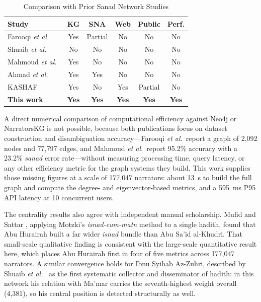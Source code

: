 \documentclass[conference]{IEEEtran}
\begin{document}
\begin{table}[!t]
\caption{Comparison with Prior Sanad Network Studies}
\label{tab:compare}
\centering
\renewcommand{\arraystretch}{1.3}
\begin{tabular}{p{1.95cm}ccccc}
\toprule
Study & KG & SNA & Web & Public & Perf. \\
\midrule
Farooqi \textit{et al.}~\cite{FAROOQI2024110439}   & Yes & Partial & No  & No  & No \\
Shuaib \textit{et al.}~\cite{Shuaib2022}           & No  & No      & No  & No  & No \\
Mahmoud \textit{et al.}~\cite{Mahmoud2024}         & Yes & No      & No  & No  & No \\
Ahmad \textit{et al.}~\cite{ahmad2025hadith}       & Yes & Yes     & No  & No  & No \\
KASHAF~\cite{shafie2021kashaf}                     & Yes & No      & Yes & Partial & No \\
\textbf{This work} & \textbf{Yes} & \textbf{Yes} & \textbf{Yes} & \textbf{Yes} & \textbf{Yes} \\
\bottomrule
\end{tabular}
\end{table}

A direct numerical comparison of computational efficiency against Neo4j
\cite{FAROOQI2024110439} or NarratorsKG \cite{Mahmoud2024} is not possible,
because both publications focus on dataset construction and disambiguation
accuracy---Farooqi \textit{et al.}\ report a graph of 2{,}092 nodes and 77{,}797
edges, and Mahmoud \textit{et al.}\ report 95.2\% accuracy with a 23.2\%
\textit{sanad} error rate---without measuring processing time, query latency, or
any other efficiency metric for the graph systems they build. This work supplies
those missing figures at a scale of 177{,}047 narrators: about 13~s to build the
full graph and compute the degree- and eigenvector-based metrics, and a 595~ms P95
API latency at 10 concurrent users.

The centrality results also agree with independent manual scholarship. Mufid and
Sattar \cite{mufid2023track}, applying Motzki's \textit{isnad-cum-matn} method to
a single hadith, found that Abu Hurairah built a far wider \textit{isnad} bundle
than Abu Sa'id al-Khudri. That small-scale qualitative finding is consistent with
the large-scale quantitative result here, which places Abu Hurairah first in four
of five metrics across 177{,}047 narrators. A similar convergence holds for Ibnu
Syihab Az-Zuhri, described by Shuaib \textit{et al.}\ \cite{Shuaib2022} as the
first systematic collector and disseminator of hadith: in this network his
relation with Ma'mar carries the seventh-highest weight overall (4{,}381),
so his central position is detected structurally as well.
\end{document}
